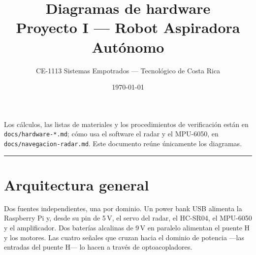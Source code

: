 \documentclass[11pt,a4paper]{article}
\title{\vspace{-1.4cm}\textbf{Diagramas de hardware}\\[2pt]
       \large Proyecto I --- Robot Aspiradora Autónomo}
\author{\small CE-1113 Sistemas Empotrados --- Tecnológico de Costa Rica}
\date{\small\today}
\begin{document}
\maketitle
\vspace{-0.8cm}

{\small Los cálculos, las listas de materiales y los procedimientos de
verificación están en \texttt{docs/hardware-*.md}; cómo usa el software el
radar y el MPU-6050, en \texttt{docs/navegacion-radar.md}. Este documento
reúne únicamente los diagramas.}

\vspace{0.2cm}
\hrule
\vspace{0.4cm}

\section{Arquitectura general}

Dos fuentes independientes, una por dominio. Un power bank USB alimenta la
Raspberry Pi y, desde su pin de 5\,V, el servo del radar, el HC-SR04, el
MPU-6050 y el amplificador. Dos baterías alcalinas de 9\,V en paralelo
alimentan el puente H y los motores. Las cuatro señales que cruzan hacia el
dominio de potencia ---las entradas del puente H--- lo hacen a través de
optoacopladores.
\end{document}
